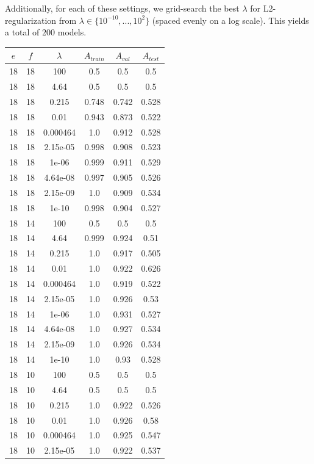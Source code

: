 Additionally, for each of these settings, we grid-search the best $\lambda$ for L2-regularization from $\lambda \in \{10^{-10}, ..., 10^{2}\}$ (spaced evenly on a log scale). This yields a total of $200$ models.


\begin{table}[ht]
\centering
\begin{tabular}{ |c|c|c|c|c|c| }
\hline
$e$ & $f$ & $\lambda$ & $A_{train}$ & $A_{val}$ & $A_{test}$ \\
\hline
18 & 18 & 100 & 0.5 & 0.5 & 0.5 \\
18 & 18 & 4.64 & 0.5 & 0.5 & 0.5 \\
18 & 18 & 0.215 & 0.748 & 0.742 & 0.528 \\
18 & 18 & 0.01 & 0.943 & 0.873 & 0.522 \\
18 & 18 & 0.000464 & 1.0 & 0.912 & 0.528 \\
18 & 18 & 2.15e-05 & 0.998 & 0.908 & 0.523 \\
18 & 18 & 1e-06 & 0.999 & 0.911 & 0.529 \\
18 & 18 & 4.64e-08 & 0.997 & 0.905 & 0.526 \\
18 & 18 & 2.15e-09 & 1.0 & 0.909 & 0.534 \\
18 & 18 & 1e-10 & 0.998 & 0.904 & 0.527 \\
18 & 14 & 100 & 0.5 & 0.5 & 0.5 \\
18 & 14 & 4.64 & 0.999 & 0.924 & 0.51 \\
18 & 14 & 0.215 & 1.0 & 0.917 & 0.505 \\
18 & 14 & 0.01 & 1.0 & 0.922 & 0.626 \\
18 & 14 & 0.000464 & 1.0 & 0.919 & 0.522 \\
18 & 14 & 2.15e-05 & 1.0 & 0.926 & 0.53 \\
18 & 14 & 1e-06 & 1.0 & 0.931 & 0.527 \\
18 & 14 & 4.64e-08 & 1.0 & 0.927 & 0.534 \\
18 & 14 & 2.15e-09 & 1.0 & 0.926 & 0.534 \\
18 & 14 & 1e-10 & 1.0 & 0.93 & 0.528 \\
18 & 10 & 100 & 0.5 & 0.5 & 0.5 \\
18 & 10 & 4.64 & 0.5 & 0.5 & 0.5 \\
18 & 10 & 0.215 & 1.0 & 0.922 & 0.526 \\
18 & 10 & 0.01 & 1.0 & 0.926 & 0.58 \\
18 & 10 & 0.000464 & 1.0 & 0.925 & 0.547 \\
18 & 10 & 2.15e-05 & 1.0 & 0.922 & 0.537 \\

\end{tabular}
\end{table}
